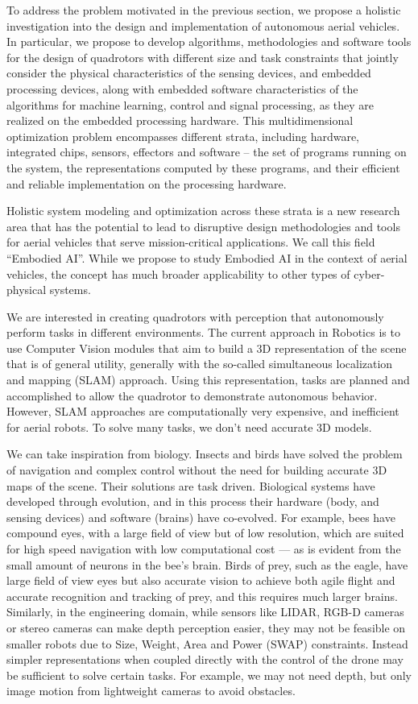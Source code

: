 To address the problem motivated in the previous section, we propose a holistic
investigation into the design and implementation of autonomous aerial vehicles.
In particular, we propose to develop algorithms, methodologies and software
tools for the design of quadrotors with different size and task constraints
that jointly consider the physical characteristics 
of the sensing devices, and embedded processing devices, along with embedded
software characteristics of the algorithms for machine learning, control and
signal processing, as they are realized on the embedded processing hardware.
This multidimensional optimization problem encompasses different strata,
including hardware, integrated chips, sensors, effectors and software -- the
set of programs running on the system, the   representations computed by these programs, and their efficient and reliable
implementation on the processing hardware. 

Holistic system modeling and optimization across these strata is a new research
area that has the potential to lead to disruptive design methodologies and
tools for aerial vehicles that serve mission-critical applications.  We call
this field ``Embodied AI''. While we propose to study Embodied AI in the
context of aerial vehicles, the concept has much broader applicability to other
types of cyber-physical systems.

We are interested in creating quadrotors with perception that autonomously
perform tasks in different environments.  The current approach in Robotics is
to use Computer Vision modules that aim to build a 3D representation of the
scene that is of general utility, generally with the so-called
simultaneous localization and mapping (SLAM) approach. Using this
representation, tasks are planned and accomplished to allow the quadrotor to
demonstrate autonomous behavior. However, SLAM approaches are computationally
very expensive, and  inefficient for aerial robots. To solve
many tasks, we don't need accurate 3D models.

We can take inspiration from biology. Insects and birds have solved the problem
of navigation and complex control without the need for building accurate 3D
maps of the scene. Their solutions are task driven.  Biological systems have
developed through evolution, and in this process their hardware (body, and
sensing devices) and software (brains) have co-evolved. For example, bees have
compound eyes, with a large field of view but of low resolution, which are
suited for high speed navigation with low computational cost --- as is evident
from the small amount of neurons in the bee's brain. Birds of prey, such as the
eagle, have large field of view eyes but also accurate vision to achieve both
agile flight and accurate recognition and tracking of prey, and this requires
much larger brains.  Similarly, in the engineering domain, while sensors like
LIDAR, RGB-D cameras or stereo cameras can make depth perception easier, they
may not be feasible on smaller robots due to Size, Weight, Area and Power (SWAP) 
constraints. Instead simpler representations when coupled directly with the control of the drone may be sufficient to solve certain tasks. For example, we may not need depth, but only image motion from lightweight cameras to avoid obstacles. 

